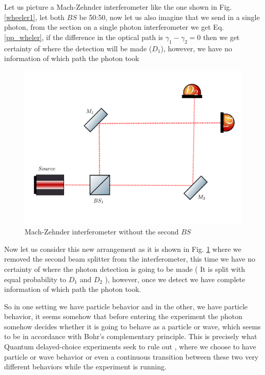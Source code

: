 \documentclass{book}
\begin{document}
Let us picture a Mach-Zehnder interferometer like the one shown in Fig. \ref{wheeler1}, let both $BS$ be 50:50, now let us also imagine that we send in a single photon, from the section on a single photon interferometer we get Eq. \ref{pp_wheler}, if the difference in the optical path is $\gamma_{1}-\gamma_{2}=0$ then we get certainty of where the detection will be made ($D_{1}$), however, we have no information  of which path the photon took

\begin{figure}[H]
\centering
\includegraphics[width=\linewidth,height=6.5 cm]{images/wheeler2.png}
\caption{Mach-Zehnder interferometer without the second $BS$}
\label{wheeler2}
\end{figure}

Now let us consider this new arrangement as it is shown in Fig. \ref{wheeler2} where we removed the second beam splitter from the interferometer, this time we have no certainty of where the photon detection is going to be made ( It is split with equal probability to $D_{1}$ and $D_{2}$ ), however, once we detect we have complete information of which path the photon took.



So in one setting we have particle behavior and in the other, we have particle behavior, it seems somehow that before entering the experiment the photon somehow decides whether it is going to behave as a particle or wave, which seems to be in accordance with Bohr's complementary principle. This is precisely what Quantum delayed-choice experiments seek to rule out \cite{Ma}, where we choose to have particle or wave behavior or even a continuous transition between these two very different behaviors while the experiment is running.
\end{document}

